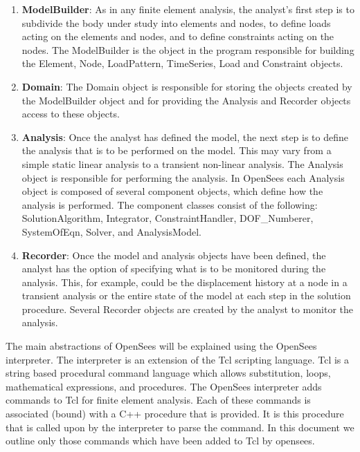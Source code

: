 \documentclass[12pt]{article}
\begin{document}
\begin{enumerate}
\item {\bf ModelBuilder}: As in any finite element analysis, the analyst's first
step is to subdivide the body under study into elements and nodes,
to define loads acting on the elements and nodes, and to define constraints
acting on the nodes. The ModelBuilder is the object in the program
responsible for building the Element, Node, LoadPattern, TimeSeries,
Load and Constraint objects.

\item {\bf Domain}: The Domain object is responsible for
storing the objects created by the ModelBuilder object and for providing the
Analysis and Recorder objects access to these objects.

\item {\bf Analysis}: Once the analyst has defined the model, the next step
is to define the analysis that is to be performed on the model. This
may vary from a simple static linear analysis to a transient
non-linear analysis. The Analysis object is responsible for performing
the analysis. In OpenSees each Analysis object is composed of several component
objects, which define how the analysis is performed. The component
classes consist of the following: { SolutionAlgorithm}, {
Integrator}, { ConstraintHandler}, { DOF\_Numberer}, {
SystemOfEqn}, { Solver}, and { AnalysisModel}. 

\item {\bf Recorder}: Once the model and analysis objects have been
defined, the analyst has the option of specifying what is to be
monitored during the analysis. This, for example, could be the
displacement history at a node in a transient analysis or the entire
state of the model at each step in the solution procedure. Several
Recorder objects are created by the analyst to monitor the analysis.
\end{enumerate}

The main abstractions of OpenSees will be explained using the OpenSees interpreter.
The interpreter is an extension of the Tcl scripting language.
Tcl is a string based procedural command language which allows
substitution, loops, mathematical expressions, and procedures. 
The OpenSees interpreter adds commands to Tcl for finite element analysis.
Each of these commands is associated (bound) with a C++
procedure that is provided. It is this procedure that is called upon
by the interpreter to parse the command. In this document we
outline only those commands which have been added to Tcl by
opensees. 
\end{document}
